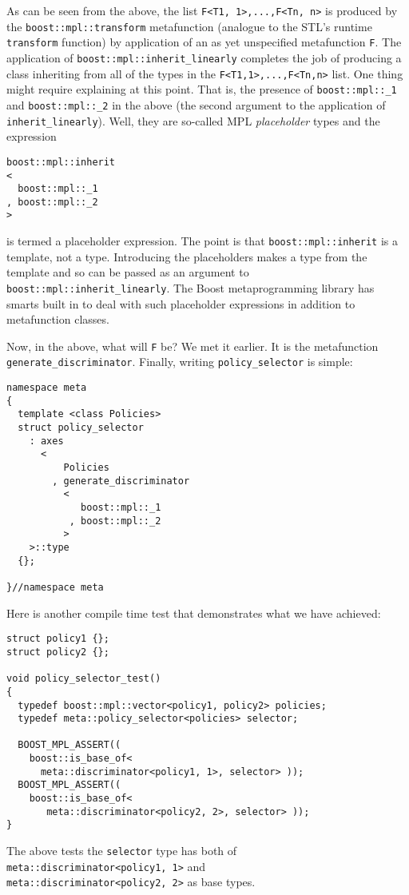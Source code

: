\documentclass[a4paper,twoside,twocolumn]{article}
\begin{document}
As can be seen from the above, the list \verb|F<T1, 1>,...,F<Tn, n>|
is produced by the \verb|boost::mpl::transform| metafunction (analogue
to the STL's runtime \verb|transform| function) by application of an
as yet unspecified metafunction \verb|F|. The application of
\verb|boost::mpl::inherit_linearly| completes the job of producing a
class inheriting from all of the types in the
\verb|F<T1,1>,...,F<Tn,n>| list. One thing might require explaining at
this point. That is, the presence of \verb|boost::mpl::_1| and
\verb|boost::mpl::_2| in the above (the second argument to the
application of \verb|inherit_linearly|). Well, they are so-called MPL
\emph{placeholder} types and the expression
\begin{verbatim} 
boost::mpl::inherit
<
  boost::mpl::_1 
, boost::mpl::_2
>
\end{verbatim} 
is termed a placeholder expression. The point is that
\verb|boost::mpl::inherit| is a template, not a type. Introducing the
placeholders makes a type from the template and so can be passed as an
argument to \verb|boost::mpl::inherit_linearly|. The Boost
metaprogramming library has smarts built in to deal with such
placeholder expressions in addition to metafunction classes.

Now, in the above, what will \verb|F| be? We met it earlier. It is the
metafunction \verb|generate_discriminator|. Finally, writing
\verb|policy_selector| is simple:
\begin{verbatim}
namespace meta
{
  template <class Policies>
  struct policy_selector
    : axes
      <
          Policies
        , generate_discriminator
          <
             boost::mpl::_1
           , boost::mpl::_2
          >
    >::type
  {};

}//namespace meta
\end{verbatim}
Here is another compile time test that demonstrates what we have achieved:
\begin{verbatim}
struct policy1 {};
struct policy2 {};

void policy_selector_test()
{
  typedef boost::mpl::vector<policy1, policy2> policies;
  typedef meta::policy_selector<policies> selector;

  BOOST_MPL_ASSERT((
    boost::is_base_of<
      meta::discriminator<policy1, 1>, selector> ));
  BOOST_MPL_ASSERT((
    boost::is_base_of<
       meta::discriminator<policy2, 2>, selector> ));
}
\end{verbatim}
The above tests the \verb|selector| type has both of\\
\verb|meta::discriminator<policy1, 1>| and\\
\verb|meta::discriminator<policy2, 2>| as base types.
\end{document}
